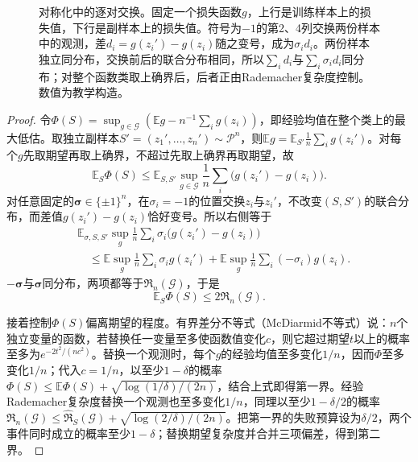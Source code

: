 \begin{figure}[htbp]
 \centering
 
 \caption{对称化中的逐对交换。固定一个损失函数$g$，上行是训练样本上的损失值，下行是副样本上的损失值。符号为$-1$的第2、4列交换两份样本中的观测，差$d_i=g(z_i')-g(z_i)$随之变号，成为$\sigma_id_i$。两份样本独立同分布，交换前后的联合分布相同，所以$\sum_id_i$与$\sum_i\sigma_id_i$同分布；对整个函数类取上确界后，后者正由Rademacher复杂度控制。数值为教学构造。}
 \label{fig:lt7-symmetrization-swap}
\end{figure}

\begin{proof}
令$\Phi(S)=\sup_{g\in\mathcal G}(\mathbb E g-n^{-1}\sum_i g(z_i))$，即经验均值在整个类上的最大低估。取独立副样本$S'=(z_1',\ldots,z_n')\sim\mathcal P^n$，则$\mathbb E g=\mathbb E_{S'}\frac1n\sum_ig(z_i')$。对每个$g$先取期望再取上确界，不超过先取上确界再取期望，故
\[
 \mathbb E_S\Phi(S)
 \leq\mathbb E_{S,S'}\sup_{g\in\mathcal G}
 \frac1n\sum_i\bigl(g(z_i')-g(z_i)\bigr).
\]
对任意固定的$\bm\sigma\in\{\pm1\}^n$，在$\sigma_i=-1$的位置交换$z_i$与$z_i'$，不改变$(S,S')$的联合分布，而差值$g(z_i')-g(z_i)$恰好变号。所以右侧等于
\[
\begin{aligned}
 &\mathbb E_{\sigma,S,S'}\sup_{g}\frac1n\sum_i\sigma_i\bigl(g(z_i')-g(z_i)\bigr)\\
 &\quad\leq\mathbb E\sup_g\frac1n\sum_i\sigma_ig(z_i')+\mathbb E\sup_g\frac1n\sum_i(-\sigma_i)g(z_i).
\end{aligned}
\]
$-\bm\sigma$与$\bm\sigma$同分布，两项都等于$\mathfrak R_n(\mathcal G)$，于是
\begin{equation}
 \mathbb E_S\Phi(S)\leq2\mathfrak R_n(\mathcal G).
 \label{eq:rademacher-symmetrization}
\end{equation}

接着控制$\Phi(S)$偏离期望的程度。有界差分不等式（McDiarmid不等式）说：$n$个独立变量的函数，若替换任一变量至多使函数值变化$c$，则它超过期望$t$以上的概率至多为$e^{-2t^2/(nc^2)}$。替换一个观测时，每个$g$的经验均值至多变化$1/n$，因而$\Phi$至多变化$1/n$；代入$c=1/n$，以至少$1-\delta$的概率$\Phi(S)\leq\mathbb E\Phi(S)+\sqrt{\log(1/\delta)/(2n)}$，结合上式即得第一界。经验Rademacher复杂度替换一个观测也至多变化$1/n$，同理以至少$1-\delta/2$的概率$\mathfrak R_n(\mathcal G)\leq\widehat{\mathfrak R}_S(\mathcal G)+\sqrt{\log(2/\delta)/(2n)}$。把第一界的失败预算设为$\delta/2$，两个事件同时成立的概率至少$1-\delta$；替换期望复杂度并合并三项偏差，得到第二界。
\end{proof}

